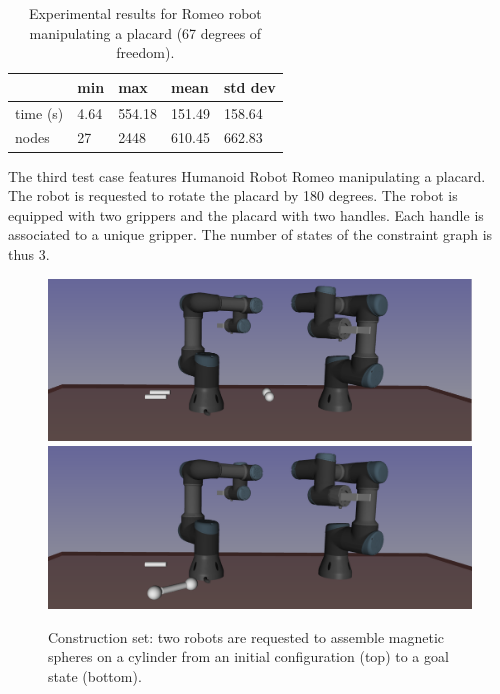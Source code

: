 \begin{table}
  \begin{center}
  \begin{tabular}{|l|l|l|l|l|}
    \hline
    & min & max & mean & std dev \\
    \hline
    time (s) & 4.64 & 554.18 & 151.49 & 158.64 \\
    nodes & 27 &  2448 & 610.45 & 662.83 \\
    \hline
  \end{tabular}
  \end{center}
  \caption{Experimental results for Romeo robot manipulating a placard
    {\color{blue}(67 degrees of freedom)}.}
  \label{tab:romeo-placard}
\end{table}

The third test case features Humanoid Robot Romeo manipulating a placard. The
robot is requested to rotate the placard by 180 degrees. The robot is equipped
with two grippers and the placard with two handles. Each handle is associated
to a unique gripper. The number of states of the constraint graph is thus 3.

\begin{figure}
  \begin{center}
    \includegraphics[width=\linewidth]{figures/construction-set-init.png}
    \includegraphics[width=\linewidth]{figures/construction-set-goal.png}    
  \end{center}
  \caption{Construction set: two robots are requested to assemble magnetic
    spheres on a cylinder from an initial configuration (top) to a goal state
    (bottom).}
  \label{fig:construction-set}
\end{figure}

